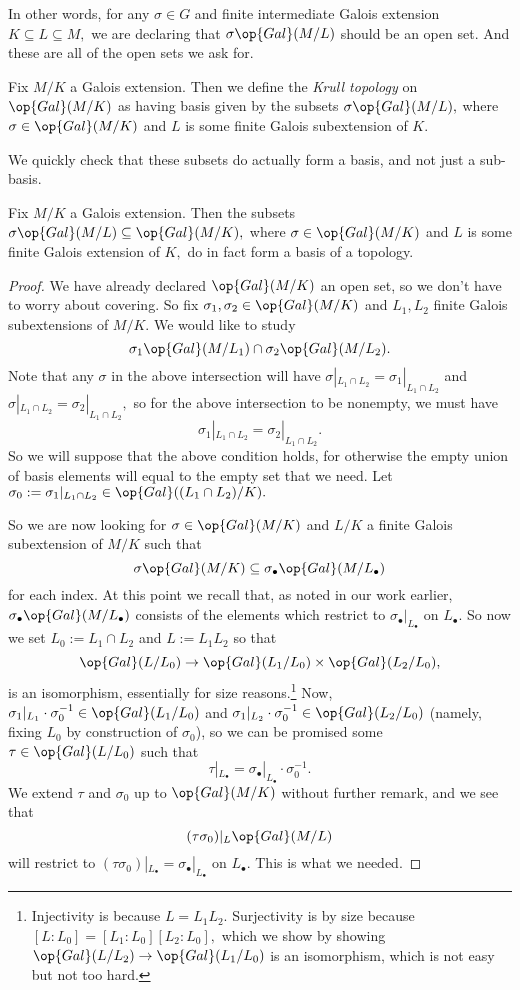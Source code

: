 \documentclass[../notes.tex]{subfiles}
\begin{document}
In other words, for any $\sigma\in G$ and finite intermediate Galois extension $K\subseteq L\subseteq M,$ we are declaring that $\sigma\op{Gal}(M/L)$ should be an open set. And these are all of the open sets we ask for.
\begin{defi}
	Fix $M/K$ a Galois extension. Then we define the \textit{Krull topology} on $\op{Gal}(M/K)$ as having basis given by the subsets $\sigma\op{Gal}(M/L),$ where $\sigma\in\op{Gal}(M/K)$ and $L$ is some finite Galois {sub}extension of $K.$
\end{defi}
We quickly check that these subsets do actually form a basis, and not just a sub-basis.
\begin{lemma}
	Fix $M/K$ a Galois extension. Then the subsets $\sigma\op{Gal}(M/L)\subseteq\op{Gal}(M/K),$ where $\sigma\in\op{Gal}(M/K)$ and $L$ is some finite Galois extension of $K,$ do in fact form a basis of a topology.
\end{lemma}
\begin{proof}
	We have already declared $\op{Gal}(M/K)$ an open set, so we don't have to worry about covering. So fix $\sigma_1,\sigma_2\in\op{Gal}(M/K)$ and $L_1,L_2$ finite Galois sub{extensions} of $M/K.$ We would like to study
	\[\sigma_1\op{Gal}(M/L_1)\cap\sigma_2\op{Gal}(M/L_2).\]
	Note that any $\sigma$ in the above intersection will have $\sigma|_{L_1\cap L_2}=\sigma_1|_{L_1\cap L_2}$ and $\sigma|_{L_1\cap L_2}=\sigma_2|_{L_1\cap L_2},$ so for the above intersection to be nonempty, we must have
	\[\sigma_1|_{L_1\cap L_2}=\sigma_2|_{L_1\cap L_2}.\]
	So we will suppose that the above condition holds, for otherwise the empty union of basis elements will equal to the empty set that we need. Let $\sigma_0:=\sigma_1|_{L_1\cap L_2}\in\op{Gal}((L_1\cap L_2)/K).$

	So we are now looking for $\sigma\in\op{Gal}(M/K)$ and $L/K$ a finite Galois {sub}extension of $M/K$ such that
	\[\sigma\op{Gal}(M/K)\subseteq\sigma_\bullet\op{Gal}(M/L_\bullet)\]
	for each index. At this point we recall that, as noted in our work earlier, $\sigma_\bullet\op{Gal}(M/L_\bullet)$ consists of the elements which restrict to $\sigma_\bullet|_{L_\bullet}$ on $L_\bullet.$ So now we set $L_0:=L_1\cap L_2$ and $L:=L_1L_2$ so that
	\[\op{Gal}(L/L_0)\to\op{Gal}(L_1/L_0)\times\op{Gal}(L_2/L_0),\]
	is an isomorphism, essentially for size reasons.\footnote{Injectivity is because $L=L_1L_2.$ Surjectivity is by size because $[L:L_0]=[L_1:L_0][L_2:L_0],$ which we show by showing $\op{Gal}(L/L_2)\to\op{Gal}(L_1/L_0)$ is an isomorphism, which is not easy but not too hard.} Now, $\sigma_1|_{L_1}\cdot\sigma_0^{-1}\in\op{Gal}(L_1/L_0)$ and $\sigma_1|_{L_2}\cdot\sigma_0^{-1}\in\op{Gal}(L_2/L_0)$ (namely, fixing $L_0$ by construction of $\sigma_0$), so we can be promised some $\tau\in\op{Gal}(L/L_0)$ such that
	\[\tau|_{L_\bullet}=\sigma_\bullet|_{L_\bullet}\cdot\sigma_0^{-1}.\]
	We extend $\tau$ and $\sigma_0$ up to $\op{Gal}(M/K)$ without further remark, and we see that
	\[(\tau\sigma_0)|_{L}\op{Gal}(M/L)\]
	will restrict to $(\tau\sigma_0)|_{L_\bullet}=\sigma_\bullet|_{L_\bullet}$ on $L_\bullet.$ This is what we needed.
\end{proof}
\end{document}

